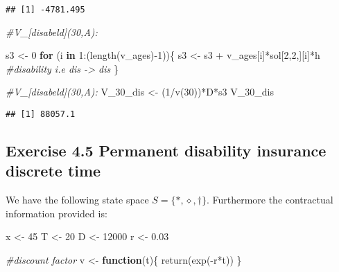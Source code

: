\documentclass[
]{article}
\newenvironment{Shaded}{\begin{snugshade}}{\end{snugshade}}
\newcommand{\CommentTok}[1]{\textcolor[rgb]{0.56,0.35,0.01}{\textit{#1}}}
\newcommand{\ControlFlowTok}[1]{\textcolor[rgb]{0.13,0.29,0.53}{\textbf{#1}}}
\newcommand{\DecValTok}[1]{\textcolor[rgb]{0.00,0.00,0.81}{#1}}
\newcommand{\FloatTok}[1]{\textcolor[rgb]{0.00,0.00,0.81}{#1}}
\newcommand{\FunctionTok}[1]{\textcolor[rgb]{0.00,0.00,0.00}{#1}}
\newcommand{\NormalTok}[1]{#1}
\newcommand{\OtherTok}[1]{\textcolor[rgb]{0.56,0.35,0.01}{#1}}
\newcommand{\SpecialCharTok}[1]{\textcolor[rgb]{0.00,0.00,0.00}{#1}}
\begin{document}
\begin{verbatim}
## [1] -4781.495
\end{verbatim}

\begin{Shaded}
\begin{Highlighting}[]
\CommentTok{\#V\_[disabeld](30,A): }

\NormalTok{s3 }\OtherTok{\textless{}{-}} \DecValTok{0} 
\ControlFlowTok{for}\NormalTok{ (i }\ControlFlowTok{in} \DecValTok{1}\SpecialCharTok{:}\NormalTok{(}\FunctionTok{length}\NormalTok{(v\_ages)}\SpecialCharTok{{-}}\DecValTok{1}\NormalTok{))\{}
\NormalTok{  s3 }\OtherTok{\textless{}{-}}\NormalTok{ s3 }\SpecialCharTok{+}\NormalTok{ v\_ages[i]}\SpecialCharTok{*}\NormalTok{sol[}\DecValTok{2}\NormalTok{,}\DecValTok{2}\NormalTok{,][i]}\SpecialCharTok{*}\NormalTok{h }\CommentTok{\#disability i.e dis {-}\textgreater{} dis}
\NormalTok{\}}


\CommentTok{\#V\_[disabeld](30,A): }
\NormalTok{V\_30\_dis }\OtherTok{\textless{}{-}}\NormalTok{ (}\DecValTok{1}\SpecialCharTok{/}\FunctionTok{v}\NormalTok{(}\DecValTok{30}\NormalTok{))}\SpecialCharTok{*}\NormalTok{D}\SpecialCharTok{*}\NormalTok{s3}
\NormalTok{V\_30\_dis}
\end{Highlighting}
\end{Shaded}

\begin{verbatim}
## [1] 88057.1
\end{verbatim}

\newpage

\hypertarget{exercise-4.5-permanent-disability-insurance-discrete-time}{%
\subsection{Exercise 4.5 Permanent disability insurance discrete
time}\label{exercise-4.5-permanent-disability-insurance-discrete-time}}

We have the following state space \(S = \{*, \diamond, \dagger\}\).
Furthermore the contractual information provided is:

\begin{Shaded}
\begin{Highlighting}[]
\NormalTok{x }\OtherTok{\textless{}{-}} \DecValTok{45} 
\NormalTok{T }\OtherTok{\textless{}{-}} \DecValTok{20} 
\NormalTok{D }\OtherTok{\textless{}{-}} \DecValTok{12000}
\NormalTok{r }\OtherTok{\textless{}{-}} \FloatTok{0.03}

\CommentTok{\#discount factor}
\NormalTok{v }\OtherTok{\textless{}{-}} \ControlFlowTok{function}\NormalTok{(t)\{}
  \FunctionTok{return}\NormalTok{(}\FunctionTok{exp}\NormalTok{(}\SpecialCharTok{{-}}\NormalTok{r}\SpecialCharTok{*}\NormalTok{t))}
\NormalTok{\}}
\end{Highlighting}
\end{Shaded}
\end{document}
